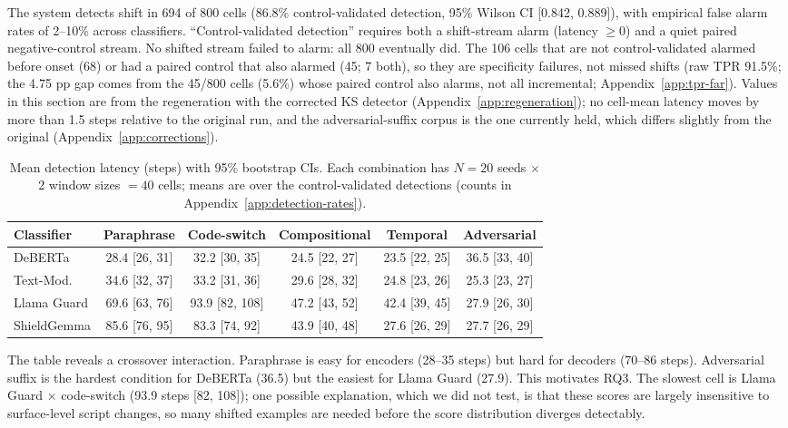 \documentclass{article}
\begin{document}
The system detects shift in 694 of 800 cells (86.8\% control-validated detection, 95\% Wilson CI [0.842, 0.889]), with empirical false alarm rates of 2--10\% across classifiers. ``Control-validated detection'' requires both a shift-stream alarm (latency $\geq 0$) and a quiet paired negative-control stream. No shifted stream failed to alarm: all 800 eventually did. The 106 cells that are not control-validated alarmed before onset (68) or had a paired control that also alarmed (45; 7 both), so they are specificity failures, not missed shifts (raw TPR 91.5\%; the 4.75 pp gap comes from the 45/800 cells (5.6\%) whose paired control also alarms, not all incremental; Appendix~\ref{app:tpr-far}). Values in this section are from the regeneration with the corrected KS detector (Appendix~\ref{app:regeneration}); no cell-mean latency moves by more than 1.5 steps relative to the original run, and the adversarial-suffix corpus is the one currently held, which differs slightly from the original (Appendix~\ref{app:corrections}).

\begin{table}[t]
\caption{Mean detection latency (steps) with 95\% bootstrap CIs. Each combination has $N{=}20$ seeds $\times$ 2 window sizes $= 40$ cells; means are over the control-validated detections (counts in Appendix~\ref{app:detection-rates}).}
\label{tab:latency}
\centering
\small
\begin{tabular}{lccccc}
\toprule
\textbf{Classifier} & \textbf{Paraphrase} & \textbf{Code-switch} & \textbf{Compositional} & \textbf{Temporal} & \textbf{Adversarial} \\
\midrule
DeBERTa & 28.4 [26, 31] & 32.2 [30, 35] & 24.5 [22, 27] & 23.5 [22, 25] & 36.5 [33, 40] \\
Text-Mod. & 34.6 [32, 37] & 33.2 [31, 36] & 29.6 [28, 32] & 24.8 [23, 26] & 25.3 [23, 27] \\
Llama Guard & 69.6 [63, 76] & 93.9 [82, 108] & 47.2 [43, 52] & 42.4 [39, 45] & 27.9 [26, 30] \\
ShieldGemma & 85.6 [76, 95] & 83.3 [74, 92] & 43.9 [40, 48] & 27.6 [26, 29] & 27.7 [26, 29] \\
\bottomrule
\end{tabular}
\end{table}

The table reveals a crossover interaction. Paraphrase is easy for encoders (28--35 steps) but hard for decoders (70--86 steps). Adversarial suffix is the hardest condition for DeBERTa (36.5) but the easiest for Llama Guard (27.9). This motivates RQ3. The slowest cell is Llama Guard $\times$ code-switch (93.9 steps [82, 108]); one possible explanation, which we did not test, is that these scores are largely insensitive to surface-level script changes, so many shifted examples are needed before the score distribution diverges detectably.
\end{document}
